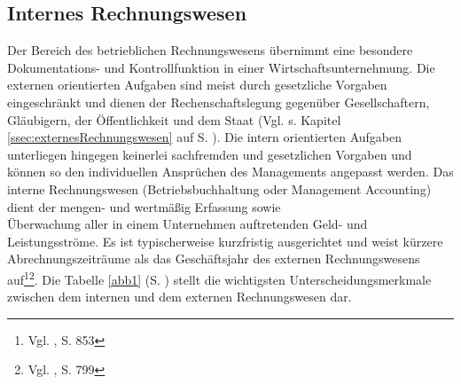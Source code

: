 \subsection{Internes Rechnungswesen}
\label{ssec:internesRechnungswesen}
Der Bereich des betrieblichen Rechnungswesens übernimmt eine besondere Dokumentations- und Kontrollfunktion in einer Wirtschaftsunternehmung.
Die externen orientierten Aufgaben sind meist durch gesetzliche Vorgaben eingeschränkt und dienen der Rechenschaftslegung gegenüber Gesellschaftern, Gläubigern, der Öffentlichkeit und dem Staat (Vgl. s. Kapitel \ref{ssec:externesRechnungswesen} auf S. \pageref{ssec:externesRechnungswesen}).
Die intern orientierten Aufgaben unterliegen hingegen keinerlei sachfremden und gesetzlichen Vorgaben und können so den individuellen Ansprüchen des Managements angepasst werden. Das interne Rechnungswesen (Betriebsbuchhaltung oder Management Accounting) dient der mengen- und wertmäßig Erfassung sowie\\ Überwachung aller in einem Unternehmen auftretenden Geld- und Leistungsströme. Es ist typischerweise kurzfristig ausgerichtet und weist kürzere Abrechnungszeiträume als das Geschäftsjahr des externen Rechnungswesens auf\footnote{Vgl. \cite{Wohe2000}, S. 853}\footnote{Vgl. \cite{Schierenbeck2008}, S. 799}.
Die Tabelle \ref{abb1} (S. \pageref{abb1}) stellt die wichtigsten Unterscheidungsmerkmale zwischen dem internen und dem externen Rechnungswesen dar.\\
